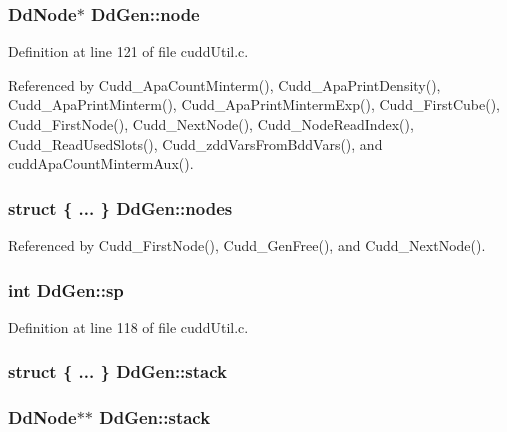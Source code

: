 \subsubsection{\setlength{\rightskip}{0pt plus 5cm}\bf{Dd\-Node}$\ast$ \bf{Dd\-Gen::node}}\label{structDdGen_7678908601787fa2d5ce4bccdd004ffb}




Definition at line 121 of file cudd\-Util.c.

Referenced by Cudd\_\-Apa\-Count\-Minterm(), Cudd\_\-Apa\-Print\-Density(), Cudd\_\-Apa\-Print\-Minterm(), Cudd\_\-Apa\-Print\-Minterm\-Exp(), Cudd\_\-First\-Cube(), Cudd\_\-First\-Node(), Cudd\_\-Next\-Node(), Cudd\_\-Node\-Read\-Index(), Cudd\_\-Read\-Used\-Slots(), Cudd\_\-zdd\-Vars\-From\-Bdd\-Vars(), and cudd\-Apa\-Count\-Minterm\-Aux().
\subsubsection{\setlength{\rightskip}{0pt plus 5cm}struct \{ ... \}   \bf{Dd\-Gen::nodes}}\label{structDdGen_6a238cddb068c258697d19c48f4797f3}




Referenced by Cudd\_\-First\-Node(), Cudd\_\-Gen\-Free(), and Cudd\_\-Next\-Node().
\subsubsection{\setlength{\rightskip}{0pt plus 5cm}int \bf{Dd\-Gen::sp}}\label{structDdGen_aff12ccc5727cf52c93db5e27a0a4eb6}




Definition at line 118 of file cudd\-Util.c.
\subsubsection{\setlength{\rightskip}{0pt plus 5cm}struct \{ ... \}   \bf{Dd\-Gen::stack}}\label{structDdGen_f405420fc6648aa758b180a7a1b5f557}


\subsubsection{\setlength{\rightskip}{0pt plus 5cm}\bf{Dd\-Node}$\ast$$\ast$ \bf{Dd\-Gen::stack}}\label{structDdGen_50762b8a4bc39e9094a414d41da2613b}




